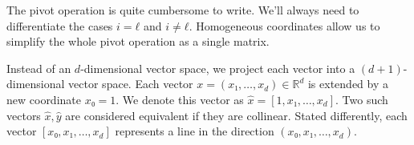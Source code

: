 The pivot operation is quite cumbersome to write.
We'll always need to differentiate the cases $i = ℓ$ and $i ≠ ℓ$.
Homogeneous coordinates allow us to simplify the whole pivot operation as a single matrix.

Instead of an $d$-dimensional vector space, we project each vector into a $(d+1)$-dimensional vector space.
Each vector $x = (x₁, …, x_d) ∈ ℝ^d$ is extended by a new coordinate $x₀ = 1$.
We denote this vector as $\hat x = [1, x₁, …, x_d]$.
Two such vectors $\hat x, \hat y$ are considered equivalent if they are collinear.
Stated differently, each vector $[x₀, x₁, …, x_d]$ represents a line in the direction $(x₀, x₁, …, x_d)$.

\begin{center}
\end{center}


